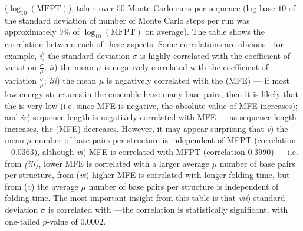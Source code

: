 \begin{table}[!ht]
{($\log_{10}(\text{MFPT})$), taken over $50$ Monte Carlo runs per sequence
(log base $10$ of the standard deviation of number of Monte Carlo
steps per run was approximately
9\% of $\log_{10}(\text{MFPT})$ on average). The table shows the correlation between each of these aspects.
Some correlations are obvious---for example,
{\em i})\;
the standard deviation $\sigma$ is highly correlated with the
coefficient of variation $\frac{\sigma}{\mu}$;
{\em ii})\;
the mean $\mu$ is negatively correlated with the
coefficient of variation $\frac{\sigma}{\mu}$;
{\em iii})\;
the mean $\mu$ is negatively correlated with the
\mfe (MFE) --- if most low energy structures in the ensemble
have many base pairs, then it is likely that the \mfe is very
low (i.e. since MFE is negative, the absolute value of MFE increases); and
{\em iv})\;
sequence length is negatively correlated with MFE --- as sequence length
increases, the \mfe (MFE) decreases.
However, it may appear surprising that
{\em v})\; the
mean $\mu$ number of base pairs per structure is independent of MFPT
(correlation $-0.0363$), although
{\em vi})\; MFE is correlated with MFPT
(correlation $0.3990$) --- i.e. from {\em (iii)},
lower MFE is correlated with a larger average $\mu$ number of base pairs per
structure, from ({\em vi})
higher MFE is correlated with longer folding time, but
from ({\em v}) the average $\mu$  number of base pairs per structure is
independent of folding time.
The most important insight from this table is that
{\em vii})\;
standard deviation $\sigma$ is correlated with \mfpt---the correlation is statistically significant, with one-tailed
$p$-value of $0.0002$.}
\label{table:correlationFFTborEmpty}
\end{table}

